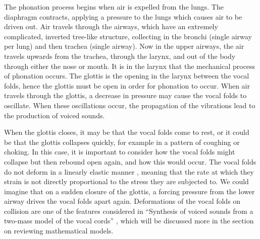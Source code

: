 \documentclass{report}
\begin{document}
The phonation process begins when air is expelled from the lungs.
The diaphragm contracts, applying a pressure to the lungs which causes air to be driven out.
Air travels through the airways, which have an extremely complicated, inverted tree-like structure,
collecting in the bronchi (single airway per lung) and then trachea (single airway).
Now in the upper airways, the air travels upwards from the trachea, through the larynx, and out of the body through either the nose or mouth.
It is in the larynx that the mechanical process of phonation occurs.
The glottis is the opening in the larynx between the vocal folds,
hence the glottis must be open in order for phonation to occur.
When air travels through the glottis,
a decrease in pressure may cause the vocal folds to oscillate.
When these oscillations occur,
the propagation of the vibrations lead to the production of voiced sounds.

When the glottis closes, it may be that the vocal folds come to rest,
or it could be that the glottis collapses quickly, for example in a pattern of coughing or choking.
In this case, it is important to consider how the vocal folds might collapse but then rebound open again,
and how this would occur.
The vocal folds do not deform in a linearly elastic manner \cite{alipour_2012},
meaning that the rate at which they strain is not directly proportional to the stress they are subjected to.
We could imagine that on a sudden closure of the glottis,
a forcing pressure from the lower airway drives the vocal folds apart again.
Deformations of the vocal folds on collision are one of the features considered in ``Synthesis of voiced sounds from a two-mass model of the vocal cords'' \cite{ishizaka_flanagan_1972},
which will be discussed more in the section on reviewing mathematical models.
\end{document}
